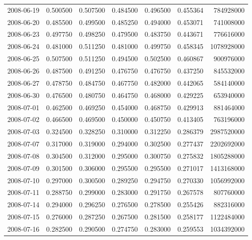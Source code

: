 \begin{tabular}{lrrrrrr}
2008-06-19 &    0.500500 &    0.507500 &    0.484500 &    0.496500 &    0.455364 &   784928000 \\
2008-06-20 &    0.485500 &    0.499500 &    0.485250 &    0.494000 &    0.453071 &   741008000 \\
2008-06-23 &    0.497750 &    0.498250 &    0.479500 &    0.483750 &    0.443671 &   776616000 \\
2008-06-24 &    0.481000 &    0.511250 &    0.481000 &    0.499750 &    0.458345 &  1078928000 \\
2008-06-25 &    0.507500 &    0.511250 &    0.494500 &    0.502500 &    0.460867 &   900976000 \\
2008-06-26 &    0.487500 &    0.491250 &    0.476750 &    0.476750 &    0.437250 &   845532000 \\
2008-06-27 &    0.478750 &    0.484750 &    0.467750 &    0.482000 &    0.442065 &   584140000 \\
2008-06-30 &    0.476500 &    0.480750 &    0.464750 &    0.468000 &    0.429225 &   653940000 \\
2008-07-01 &    0.462500 &    0.469250 &    0.454000 &    0.468750 &    0.429913 &   881464000 \\
2008-07-02 &    0.466500 &    0.469500 &    0.450000 &    0.450750 &    0.413405 &   763196000 \\
2008-07-03 &    0.324500 &    0.328250 &    0.310000 &    0.312250 &    0.286379 &  2987520000 \\
2008-07-07 &    0.317000 &    0.319000 &    0.294000 &    0.302500 &    0.277437 &  2202692000 \\
2008-07-08 &    0.304500 &    0.312000 &    0.295000 &    0.300750 &    0.275832 &  1805288000 \\
2008-07-09 &    0.301500 &    0.306000 &    0.295500 &    0.295500 &    0.271017 &  1413168000 \\
2008-07-10 &    0.297000 &    0.300500 &    0.289250 &    0.294750 &    0.270330 &  1056992000 \\
2008-07-11 &    0.288750 &    0.299000 &    0.283000 &    0.291750 &    0.267578 &   807760000 \\
2008-07-14 &    0.294000 &    0.296250 &    0.276500 &    0.278500 &    0.255426 &   882316000 \\
2008-07-15 &    0.276000 &    0.287250 &    0.267500 &    0.281500 &    0.258177 &  1122484000 \\
2008-07-16 &    0.282500 &    0.290500 &    0.274750 &    0.283000 &    0.259553 &  1034392000 \\

\end{tabular}
